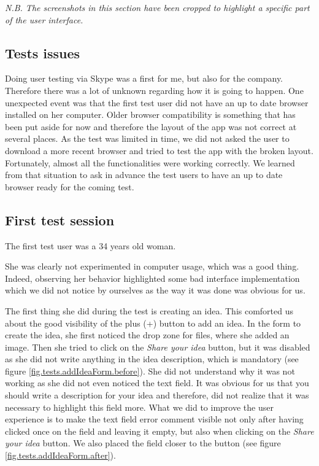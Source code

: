 \documentclass[a4paper,12pt, oneside]{article}
\begin{document}
\emph{N.B. The screenshots in this section have been cropped to highlight a specific part of the user interface.}

\subsection{Tests issues}
Doing user testing via Skype was a first for me, but also for the company.
Therefore there was a lot of unknown regarding how it is going to happen.
One unexpected event was that the first test user did not have an up to date browser installed on her computer.
Older browser compatibility is something that has been put aside for now and therefore the layout of the app was not correct at several places.
As the test was limited in time, we did not asked the user to download a more recent browser and tried to test the app with the broken layout.
Fortunately, almost all the functionalities were working correctly.
We learned from that situation to ask in advance the test users to have an up to date browser ready for the coming test.

\subsection{First test session}
The first test user was a 34 years old woman.

She was clearly not experimented in computer usage, which was a good thing.
Indeed, observing her behavior highlighted some bad interface implementation which we did not notice by ourselves as the way it was done was obvious for us.

The first thing she did during the test is creating an idea. This comforted us about the good visibility of the plus (+) button to add an idea.
In the form to create the idea, she first noticed the drop zone for files, where she added an image.
Then she tried to click on the \emph{Share your idea} button, but it was disabled as she did not write anything in the idea description, which is mandatory (see figure \ref{fig.tests.addIdeaForm.before}).
She did not understand why it was not working as she did not even noticed the text field.
It was obvious for us that you should write a description for your idea and therefore, did not realize that it was necessary to highlight this field more.
What we did to improve the user experience is to make the text field error comment visible not only after having clicked once on the field and leaving it empty, but also when clicking on the \emph{Share your idea} button.
We also placed the field closer to the button (see figure \ref{fig.tests.addIdeaForm.after}).
\end{document}
